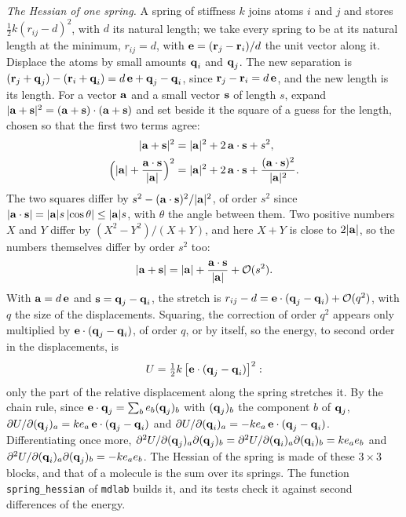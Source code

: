 \emph{The Hessian of one spring.} A spring of stiffness $k$ joins atoms $i$
and $j$ and stores $\frac12 k(r_{ij} - d)^2$, with $d$ its natural
length; we take every spring to be at its natural length at the minimum,
$r_{ij} = d$, with $\bm{\mathrm{e}} = (\bm{\mathrm{r}}_j - \bm{\mathrm{r}}_i)/d$ the unit vector along
it. Displace the atoms by small amounts $\bm{\mathrm{q}}_i$ and $\bm{\mathrm{q}}_j$. The new
separation is $(\bm{\mathrm{r}}_j + \bm{\mathrm{q}}_j) - (\bm{\mathrm{r}}_i + \bm{\mathrm{q}}_i) = d\,\bm{\mathrm{e}} +
\bm{\mathrm{q}}_j - \bm{\mathrm{q}}_i$, since $\bm{\mathrm{r}}_j - \bm{\mathrm{r}}_i = d\,\bm{\mathrm{e}}$, and the new
length is its length. For a vector $\bm{\mathrm{a}}$ and a small vector $\bm{\mathrm{s}}$ of
length $s$, expand $\lvert\bm{\mathrm{a}} + \bm{\mathrm{s}}\rvert^2 = (\bm{\mathrm{a}} + \bm{\mathrm{s}})\cdot
(\bm{\mathrm{a}} + \bm{\mathrm{s}})$ and set beside it the square of a guess for the length,
chosen so that the first two terms agree:
\begin{align*}
   \lvert\bm{\mathrm{a}} + \bm{\mathrm{s}}\rvert^2
   &= \lvert\bm{\mathrm{a}}\rvert^2 + 2\,\bm{\mathrm{a}}\cdot\bm{\mathrm{s}} + s^2 ,\\
   \Bigl(\lvert\bm{\mathrm{a}}\rvert + \frac{\bm{\mathrm{a}}\cdot\bm{\mathrm{s}}}{\lvert\bm{\mathrm{a}}\rvert}
   \Bigr)^2
   &= \lvert\bm{\mathrm{a}}\rvert^2 + 2\,\bm{\mathrm{a}}\cdot\bm{\mathrm{s}}
      + \frac{(\bm{\mathrm{a}}\cdot\bm{\mathrm{s}})^2}{\lvert\bm{\mathrm{a}}\rvert^2} .
\end{align*}
The two squares differ by $s^2 - (\bm{\mathrm{a}}\cdot\bm{\mathrm{s}})^2/\lvert\bm{\mathrm{a}}
\rvert^2$, of order $s^2$ since $\lvert\bm{\mathrm{a}}\cdot\bm{\mathrm{s}}\rvert = \lvert
\bm{\mathrm{a}}\rvert s\,\lvert\cos\theta\rvert \le \lvert\bm{\mathrm{a}}\rvert s$, with
$\theta$ the angle between them. Two positive numbers
$X$ and $Y$ differ by $(X^2 - Y^2)/(X + Y)$, and here $X + Y$ is close to
$2\lvert\bm{\mathrm{a}}\rvert$, so the numbers themselves differ by order $s^2$
too:
\begin{equation*}
   \lvert\bm{\mathrm{a}} + \bm{\mathrm{s}}\rvert = \lvert\bm{\mathrm{a}}\rvert
   + \frac{\bm{\mathrm{a}}\cdot\bm{\mathrm{s}}}{\lvert\bm{\mathrm{a}}\rvert} + \mathcal{O}(s^2) .
\end{equation*}
With $\bm{\mathrm{a}} = d\,\bm{\mathrm{e}}$ and $\bm{\mathrm{s}} = \bm{\mathrm{q}}_j - \bm{\mathrm{q}}_i$, the stretch
is $r_{ij} - d = \bm{\mathrm{e}}\cdot(\bm{\mathrm{q}}_j - \bm{\mathrm{q}}_i) + \mathcal{O}(q^2)$, with $q$
the size of the displacements. Squaring, the correction of order $q^2$
appears only multiplied by $\bm{\mathrm{e}}\cdot(\bm{\mathrm{q}}_j - \bm{\mathrm{q}}_i)$, of order
$q$, or by itself, so the energy, to second order in the displacements,
is
\begin{equation*}
   U = \tfrac12 k\,\bigl[\bm{\mathrm{e}}\cdot(\bm{\mathrm{q}}_j - \bm{\mathrm{q}}_i)\bigr]^2 :
\end{equation*}
only the part of the relative displacement along the spring stretches it.
By the chain rule, since $\bm{\mathrm{e}}\cdot\bm{\mathrm{q}}_j = \sum_b
e_b(\bm{\mathrm{q}}_j)_b$ with $(\bm{\mathrm{q}}_j)_b$ the component $b$ of $\bm{\mathrm{q}}_j$, $\partial U/
\partial (\bm{\mathrm{q}}_j)_a = ke_a\,\bm{\mathrm{e}}\cdot(\bm{\mathrm{q}}_j - \bm{\mathrm{q}}_i)$ and $\partial U/
\partial (\bm{\mathrm{q}}_i)_a = -ke_a\,\bm{\mathrm{e}}\cdot(\bm{\mathrm{q}}_j - \bm{\mathrm{q}}_i)$. Differentiating
once more, $\partial^2U/\partial (\bm{\mathrm{q}}_j)_a\partial (\bm{\mathrm{q}}_j)_b = \partial^2U/
\partial (\bm{\mathrm{q}}_i)_a\partial (\bm{\mathrm{q}}_i)_b = ke_ae_b$ and $\partial^2U/\partial (\bm{\mathrm{q}}_i)_a
\partial (\bm{\mathrm{q}}_j)_b = -ke_ae_b$. The Hessian of the spring is made of these $3\times3$ blocks,
and that of a molecule is the sum over its springs. The function
\texttt{spring\_hessian} of \texttt{mdlab} builds it, and its tests check
it against second differences of the energy.

